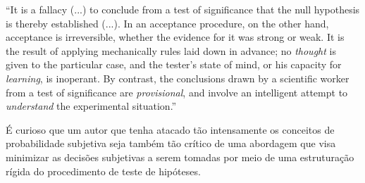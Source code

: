 ``It is a fallacy (...) to conclude from a test of significance that the null hypothesis is thereby established (...).
In an acceptance procedure, on the other hand, acceptance is irreversible, whether the evidence for it was strong or weak.
It is the result of applying mechanically rules laid down in advance; no {\em thought} is given to the particular case,
and the tester's state of mind, or his capacity for {\em learning}, is inoperant.
By contrast, the conclusions drawn by a scientific worker from a test of significance are {\em provisional}, and involve
an intelligent attempt to {\em understand} the experimental situation.''\citep{Fisher1955}

É curioso que um autor que tenha atacado tão intensamente os conceitos de probabilidade subjetiva seja também tão crítico de 
uma abordagem que visa minimizar as decisões subjetivas a serem tomadas por meio de uma estruturação rígida do procedimento
de teste de hipóteses. 

